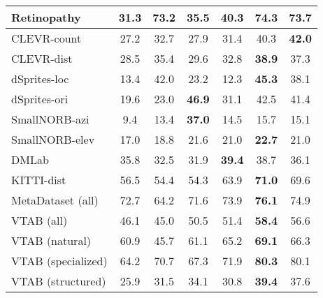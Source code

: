 \documentclass{article}
\begin{document}
\begin{table}[H]
\begin{center}
\begin{small}
\begin{tabular}{lcccccc}
Retinopathy & 31.3 & 73.2 & 35.5 & 40.3 & \textbf{74.3} & 73.7\\
\midrule
CLEVR-count & 27.2 & 32.7 & 27.9 & 31.4 & 40.3 & \textbf{42.0}\\
CLEVR-dist & 28.5 & 35.4 & 29.6 & 32.8 & \textbf{38.9} & 37.3\\
dSprites-loc & 13.4 & 42.0 & 23.2 & 12.3 & \textbf{45.3} & 38.1\\
dSprites-ori & 19.6 & 23.0 & \textbf{46.9} & 31.1 & 42.5 & 41.4\\
SmallNORB-azi & 9.4 & 13.4 & \textbf{37.0} & 14.5 & 15.7 & 15.1\\
SmallNORB-elev & 17.0 & 18.8 & 21.6 & 21.0 & \textbf{22.7} & 21.0\\
DMLab & 35.8 & 32.5 & 31.9 & \textbf{39.4} & 38.7 & 36.1\\
KITTI-dist & 56.5 & 54.4 & 54.3 & 63.9 & \textbf{71.0} & 69.6\\
\midrule
MetaDataset (all) & 72.7 & 64.2 & 71.6 & 73.9 & \textbf{76.1} & 74.9\\
VTAB (all) & 46.1 & 45.0 & 50.5 & 51.4 & \textbf{58.4} & 56.6\\
VTAB (natural) & 60.9 & 45.7 & 61.1 & 65.2 & \textbf{69.1} & 66.3\\
VTAB (specialized) & 64.2 & 70.7 & 67.3 & 71.9 & \textbf{80.3} & 80.1\\
VTAB (structured) & 25.9 & 31.5 & 34.1 & 30.8 & \textbf{39.4} & 37.6\\
\bottomrule
\end{tabular}
\label{tab:breakdown_uppercase_vs_metalearning}
\end{small}
\end{center}
\vskip -0.1in
\end{table}
\end{document}
